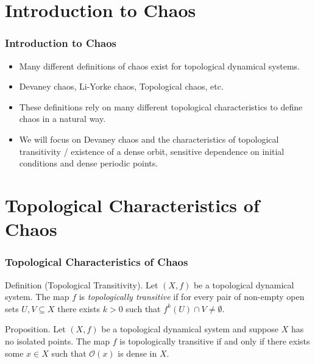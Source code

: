 \documentclass{beamer}
\begin{document}
\section{Introduction to Chaos}

\begin{frame}
    \frametitle{Introduction to Chaos}
    \begin{itemize}
        \item Many different definitions of chaos exist for topological dynamical systems.
        \item Devaney chaos, Li-Yorke chaos, Topological chaos, etc.
        \item These definitions rely on many different topological characteristics to define chaos in a natural way.
        \item We will focus on Devaney chaos and the characteristics of topological transitivity / existence of a dense orbit, sensitive dependence on initial conditions and dense periodic points.
    \end{itemize}
\end{frame}

\section{Topological Characteristics of Chaos}
\begin{frame}
    \frametitle{Topological Characteristics of Chaos}
    \begin{block}{Definition (Topological Transitivity).}
        Let $(X, f)$ be a topological dynamical system. The map $f$ is \emph{topologically transitive} if for every pair of non-empty open sets $U, V \subseteq X$ there exists $k > 0$ such that $f^k(U) \cap V \neq \emptyset$.
    \end{block}
    \vspace{0.5cm}
    \begin{block}{Proposition.}
        Let $(X, f)$ be a topological dynamical system and suppose $X$ has no isolated points. The map $f$ is topologically transitive if and only if there exists some $x \in X$ such that $\mathcal{O}(x)$ is dense in $X$. \cite{silverman}
    \end{block}
\end{frame}
\end{document}
